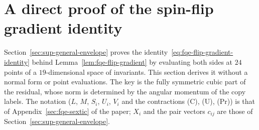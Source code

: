 \section{A direct proof of the spin-flip gradient identity}\label{sec:sup-flip-gradient}
Section~\ref{sec:sup-general-envelope} proves the identity~\eqref{eq:fqe-flip-gradient-identity} behind Lemma~\ref{lem:fqe-flip-gradient} by evaluating both sides
at $24$ points of a $19$-dimensional space of invariants. This section derives it without a normal form or point evaluations. The
key is the fully symmetric cubic part of the residual, whose norm is determined by the angular momentum of the copy labels.
The notation ($L$, $M$, $S_i$, $U_i$, $V_i$ and the contractions (C), (U), (Pr)) is that of
Appendix~\ref{sec:fqe-sextic} of the paper; $X_i$ and the pair vectors $c_{ij}$ are those of Section~\ref{sec:sup-general-envelope}.


